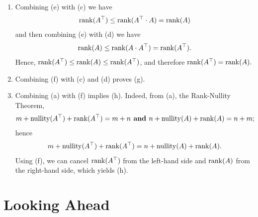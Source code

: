 \begin{enumerate}
  \item Combining (e) with (c) we have
  $$ \mathrm{rank}(A^\top) \le \mathrm{rank}(A^\top \cdot A)=\mathrm{rank}(A) $$
  and then combining (e) with (d) we have
  $$ \mathrm{rank}(A) \le \mathrm{rank}(A \cdot A^\top)=\mathrm{rank}(A^\top). $$
  Hence, $ \mathrm{rank}(A^\top) \le \mathrm{rank}(A) \le \mathrm{rank}(A^\top) $, and therefore
   $ \mathrm{rank}(A^\top) =\mathrm{rank}(A) .$
   
   \item Combining (f) with (c) and (d) proves (g).
   
   \item  Combining (a) with (f) implies (h). Indeed, from (a), the Rank-Nullity Theorem,
   $$ m +  \mathrm{nullity}(A^\top)+ \mathrm{rank}(A^\top) = m+n \textbf{   and   }  n + \mathrm{nullity}(A)+ \mathrm{rank}(A) = n + m;$$
   hence 
    $$  m +  \mathrm{nullity}(A^\top)+ \mathrm{rank}(A^\top) =  n + \mathrm{nullity}(A)+ \mathrm{rank}(A) .$$
Using (f), we can cancel $\mathrm{rank}(A^\top)$ from the left-hand side and $\mathrm{rank}(A)$ from the right-hand side, which yields (h).
  \end{enumerate}
  \Qed
  \vspace*{.2cm}

\section{Looking Ahead}

